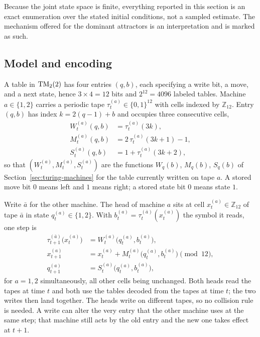 \documentclass{article}
\begin{document}
Because the joint state space is finite, everything reported in this
section is an exact enumeration over the stated initial conditions, not a
sampled estimate.  The mechanism offered for the dominant attractors is an
interpretation and is marked as such.

\subsection{Model and encoding}

A table in ${\rm TM}_2(2)$ has four entries $(q,b)$, each specifying a write
bit, a move, and a next state, hence $3\times4=12$ bits and $2^{12}=4096$
labeled tables.  Machine $a\in\{1,2\}$ carries a periodic tape
$\tau^{(a)}_t\in\{0,1\}^{12}$ with cells indexed by $\mathbb Z_{12}$.  Entry
$(q,b)$ has index $k=2(q-1)+b$ and occupies three consecutive cells,
\begin{equation}
\begin{aligned}
W^{(a)}_t(q,b)&=\tau^{(a)}_t(3k),\\
M^{(a)}_t(q,b)&=2\,\tau^{(a)}_t(3k+1)-1,\\
S^{(a)}_t(q,b)&=1+\tau^{(a)}_t(3k+2),
\end{aligned}
\label{eq:program-tape-layout}
\end{equation}
so that $(W^{(a)}_t,M^{(a)}_t,S^{(a)}_t)$ are the functions $W_q(b)$,
$M_q(b)$, $S_q(b)$ of Section~\ref{sec:turing-machines} for the table
currently written on tape $a$.  A stored move bit $0$ means left and $1$
means right; a stored state bit $0$ means state $1$.

Write $\bar a$ for the other machine.  The head of machine $a$ sits at
cell $x^{(a)}_t\in\mathbb Z_{12}$ of tape $\bar a$ in state
$q^{(a)}_t\in\{1,2\}$.  With $b^{(a)}_t=\tau^{(\bar a)}_t(x^{(a)}_t)$
the symbol it reads, one step is
\begin{align}
\tau^{(\bar a)}_{t+1}\bigl(x^{(a)}_t\bigr)
 &= W^{(a)}_t\bigl(q^{(a)}_t,b^{(a)}_t\bigr),\\
x^{(a)}_{t+1}
 &= x^{(a)}_t+M^{(a)}_t\bigl(q^{(a)}_t,b^{(a)}_t\bigr)\pmod{12},\\
q^{(a)}_{t+1}
 &= S^{(a)}_t\bigl(q^{(a)}_t,b^{(a)}_t\bigr),
\end{align}
for $a=1,2$ simultaneously, all other cells being unchanged.  Both heads
read the tapes at time $t$ and both use the tables decoded from the tapes
at time $t$; the two writes then land together.  The heads write on
different tapes, so no collision rule is needed.  A write can alter the very
entry that the other machine uses at the same step; that machine still acts
by the old entry and the new one takes effect at $t+1$.
\end{document}
